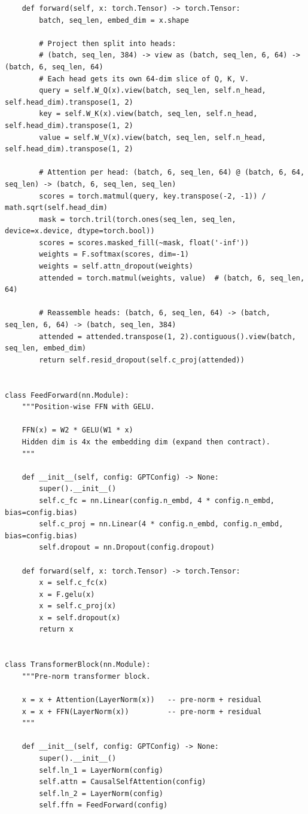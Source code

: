 \begin{lstlisting}
    def forward(self, x: torch.Tensor) -> torch.Tensor:
        batch, seq_len, embed_dim = x.shape

        # Project then split into heads:
        # (batch, seq_len, 384) -> view as (batch, seq_len, 6, 64) -> (batch, 6, seq_len, 64)
        # Each head gets its own 64-dim slice of Q, K, V.
        query = self.W_Q(x).view(batch, seq_len, self.n_head, self.head_dim).transpose(1, 2)
        key = self.W_K(x).view(batch, seq_len, self.n_head, self.head_dim).transpose(1, 2)
        value = self.W_V(x).view(batch, seq_len, self.n_head, self.head_dim).transpose(1, 2)

        # Attention per head: (batch, 6, seq_len, 64) @ (batch, 6, 64, seq_len) -> (batch, 6, seq_len, seq_len)
        scores = torch.matmul(query, key.transpose(-2, -1)) / math.sqrt(self.head_dim)
        mask = torch.tril(torch.ones(seq_len, seq_len, device=x.device, dtype=torch.bool))
        scores = scores.masked_fill(~mask, float('-inf'))
        weights = F.softmax(scores, dim=-1)
        weights = self.attn_dropout(weights)
        attended = torch.matmul(weights, value)  # (batch, 6, seq_len, 64)

        # Reassemble heads: (batch, 6, seq_len, 64) -> (batch, seq_len, 6, 64) -> (batch, seq_len, 384)
        attended = attended.transpose(1, 2).contiguous().view(batch, seq_len, embed_dim)
        return self.resid_dropout(self.c_proj(attended))


class FeedForward(nn.Module):
    """Position-wise FFN with GELU.

    FFN(x) = W2 * GELU(W1 * x)
    Hidden dim is 4x the embedding dim (expand then contract).
    """

    def __init__(self, config: GPTConfig) -> None:
        super().__init__()
        self.c_fc = nn.Linear(config.n_embd, 4 * config.n_embd, bias=config.bias)
        self.c_proj = nn.Linear(4 * config.n_embd, config.n_embd, bias=config.bias)
        self.dropout = nn.Dropout(config.dropout)

    def forward(self, x: torch.Tensor) -> torch.Tensor:
        x = self.c_fc(x)
        x = F.gelu(x)
        x = self.c_proj(x)
        x = self.dropout(x)
        return x


class TransformerBlock(nn.Module):
    """Pre-norm transformer block.

    x = x + Attention(LayerNorm(x))   -- pre-norm + residual
    x = x + FFN(LayerNorm(x))         -- pre-norm + residual
    """

    def __init__(self, config: GPTConfig) -> None:
        super().__init__()
        self.ln_1 = LayerNorm(config)
        self.attn = CausalSelfAttention(config)
        self.ln_2 = LayerNorm(config)
        self.ffn = FeedForward(config)


\end{lstlisting}
